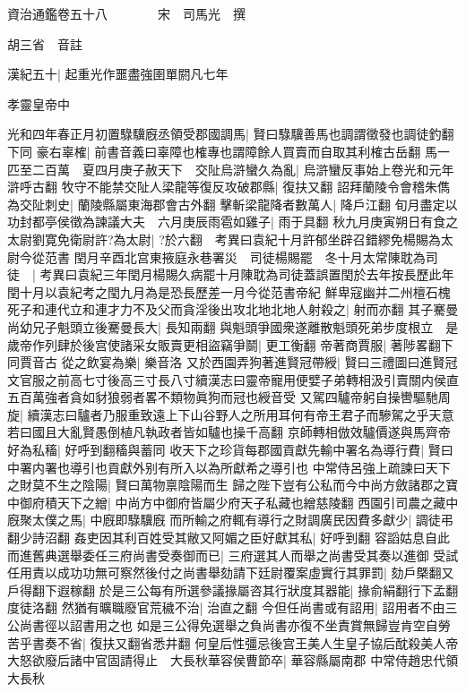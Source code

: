 資治通鑑卷五十八　　　　宋　司馬光　撰

胡三省　音註

漢紀五十|{
	起重光作噩盡強圉單閼凡七年}


孝靈皇帝中

光和四年春正月初置騄驥廐丞領受郡國調馬|{
	賢曰騄驥善馬也調謂徵發也調徒釣翻下同}
豪右辜榷|{
	前書音義曰辜障也榷專也謂障餘人買賣而自取其利榷古岳翻}
馬一匹至二百萬　夏四月庚子赦天下　交阯烏滸蠻久為亂|{
	烏滸蠻反事始上卷光和元年滸呼古翻}
牧守不能禁交阯人梁龍等復反攻破郡縣|{
	復扶又翻}
詔拜蘭陵令會稽朱儁為交阯刺史|{
	蘭陵縣屬東海郡會古外翻}
擊斬梁龍降者數萬人|{
	降戶江翻}
旬月盡定以功封都亭侯徵為諫議大夫　六月庚辰雨雹如雞子|{
	雨于具翻}
秋九月庚寅朔日有食之　太尉劉寛免衛尉許?為太尉|{
	?於六翻　考異曰袁紀十月許郁坐辟召錯繆免楊賜為太尉今從范書}
閏月辛酉北宫東掖庭永巷署災　司徒楊賜罷　冬十月太常陳耽為司徒　|{
	考異曰袁紀三年閏月楊賜久病罷十月陳耽為司徒蓋誤置閏於去年按長歷此年閏十月以袁紀考之閠九月為是恐長歷差一月今從范書帝紀}
鮮卑寇幽并二州檀石槐死子和連代立和連才力不及父而貪淫後出攻北地北地人射殺之|{
	射而亦翻}
其子騫曼尚幼兄子魁頭立後騫曼長大|{
	長知兩翻}
與魁頭爭國衆遂離散魁頭死弟步度根立　是歲帝作列肆於後宫使諸采女販賣更相盜竊爭鬬|{
	更工衡翻}
帝著商賈服|{
	著陟畧翻下同賈音古}
從之飲宴為樂|{
	樂音洛}
又於西園弄狗著進賢冠帶綬|{
	賢曰三禮圖曰進賢冠文官服之前高七寸後高三寸長八寸續漢志曰靈帝寵用便嬖子弟轉相汲引賣關内侯直五百萬強者貪如豺狼弱者畧不類物眞狗而冠也綬音受}
又駕四驢帝躬自操轡驅馳周旋|{
	續漢志曰驢者乃服重致遠上下山谷野人之所用耳何有帝王君子而驂駕之乎天意若曰國且大亂賢愚倒植凡執政者皆如驢也操千高翻}
京師轉相倣效驢價遂與馬齊帝好為私稸|{
	好呼到翻稸與蓄同}
收天下之珍貨每郡國貢獻先輸中署名為導行費|{
	賢曰中署内署也導引也貢獻外别有所入以為所獻希之導引也}
中常侍呂強上疏諫曰天下之財莫不生之陰陽|{
	賢曰萬物禀陰陽而生}
歸之陛下豈有公私而今中尚方斂諸郡之寶中御府積天下之繒|{
	中尚方中御府皆屬少府天子私藏也繒慈陵翻}
西園引司農之藏中廐聚太僕之馬|{
	中廐即騄驥廐}
而所輸之府輒有導行之財調廣民因費多獻少|{
	調徒弔翻少詩沼翻}
姦吏因其利百姓受其敝又阿媚之臣好獻其私|{
	好呼到翻}
容謟姑息自此而進舊典選舉委任三府尚書受奏御而已|{
	三府選其人而舉之尚書受其奏以進御}
受試任用責以成功功無可察然後付之尚書舉劾請下廷尉覆案虛實行其罪罰|{
	劾戶槩翻又戶得翻下遐稼翻}
於是三公每有所選參議掾屬咨其行狀度其器能|{
	掾俞絹翻行下孟翻度徒洛翻}
然猶有曠職廢官荒穢不治|{
	治直之翻}
今但任尚書或有詔用|{
	詔用者不由三公尚書徑以詔書用之也}
如是三公得免選舉之負尚書亦復不坐責賞無歸豈肯空自勞苦乎書奏不省|{
	復扶又翻省悉井翻}
何皇后性彊忌後宫王美人生皇子協后酖殺美人帝大怒欲廢后諸中官固請得止　大長秋華容侯曹節卒|{
	華容縣屬南郡}
中常侍趙忠代領大長秋

